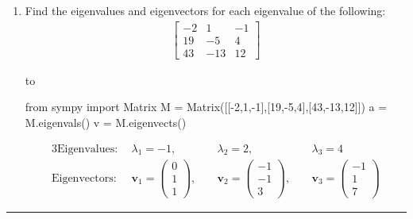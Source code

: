 \documentclass[11pt]{article}
\newcommand{\hdotrule}[1]{\hbox to \textwidth{\leaders\hbox to #1pt{\hss . \hss}\hfil}}
\begin{document}
\begin{preview}
\begin{enumerate}
            \item Find the eigenvalues and eigenvectors for each eigenvalue of the following: 
            \begin{align*}
                  \begin{bmatrix}-2&1&-1\\ 19&-5&4\\ 43&-13&12\end{bmatrix}
            \end{align*}

            \hdotrule{5}

            \begin{python}
                  from sympy import Matrix
                  M = Matrix([[-2,1,-1],[19,-5,4],[43,-13,12]])
                  a = M.eigenvals()
                  v = M.eigenvects()
            \end{python}
            \begin{alignat*}{3}
                  \mathrm{Eigenvalues:} \; &\lambda_1 = -1, \; &&\lambda_2 = 2, \; &&\lambda_3 = 4 \\
                  \mathrm{Eigenvectors:} \; &\textbf{v}_1 = \begin{pmatrix}0\\1\\1\end{pmatrix}, \; &&\textbf{v}_2= \begin{pmatrix}-1\\-1\\3\end{pmatrix}, \; &&\textbf{v}_3= \begin{pmatrix}-1\\1\\7\end{pmatrix}
            \end{alignat*}
      \end{enumerate}
      \hrule
\end{preview}
\end{document}

